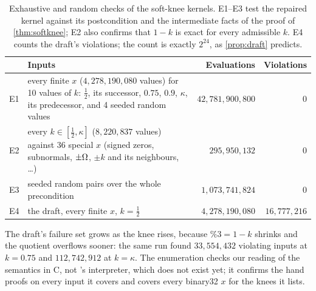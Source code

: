 \begin{table}[t]
\centering
\small
\begin{tabularx}{\linewidth}{@{}l>{\raggedright\arraybackslash}Xrr@{}}
\toprule
& Inputs & Evaluations & Violations \\
\midrule
E1 & every finite $x$ ($4{,}278{,}190{,}080$ values) for 10 values of $k$: $\frac12$, its
  successor, $0.75$, $0.9$, $\kappa$, its predecessor, and 4 seeded random values &
  $42{,}781{,}900{,}800$ & 0 \\
E2 & every $k\in[\frac12,\kappa]$ ($8{,}220{,}837$ values) against 36 special $x$ (signed zeros,
  subnormals, $\pm\Omega$, $\pm k$ and its neighbours, \dots) & $295{,}950{,}132$ & 0 \\
E3 & seeded random pairs over the whole precondition & $1{,}073{,}741{,}824$ & 0 \\
E4 & the draft, every finite $x$, $k=\frac12$ & $4{,}278{,}190{,}080$ & $16{,}777{,}216$ \\
\bottomrule
\end{tabularx}
\caption{Exhaustive and random checks of the soft-knee kernels. E1--E3 test the repaired kernel
against its postcondition and the intermediate facts of the proof of \cref{thm:softknee}; E2
also confirms that $1-k$ is exact for every admissible $k$. E4 counts the draft's violations;
the count is exactly $2^{24}$, as \cref{prop:draft} predicts.}
\label{tab:enum}
\end{table}

The draft's failure set grows as the knee rises, because $\%3=1-k$ shrinks and the quotient
overflows sooner: the same run found $33{,}554{,}432$ violating inputs at $k=0.75$ and
$112{,}742{,}912$ at $k=\kappa$. The enumeration checks our reading of the semantics in C, not
\VG's interpreter, which does not exist yet; it confirms the hand proofs on every input it
covers and covers every binary32 $x$ for the knees it lists.

